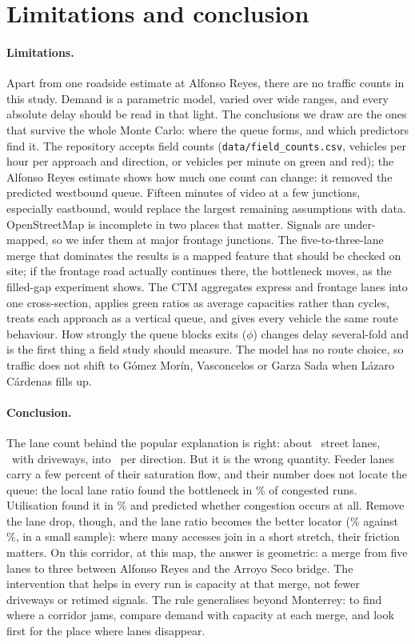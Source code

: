 \section{Limitations and conclusion}
\label{sec:conclusion}

\paragraph{Limitations.} Apart from one roadside estimate at Alfonso
Reyes, there are no traffic counts in this study. Demand is a parametric model, varied over wide ranges, and every absolute
delay should be read in that light. The conclusions we draw are the ones
that survive the whole Monte Carlo: where the queue forms, and which
predictors find it. The repository accepts field counts
(\texttt{data/field\_counts.csv}, vehicles per hour per approach and
direction, or vehicles per minute on green and red); the Alfonso Reyes
estimate shows how much one count can change: it removed the predicted
westbound queue. Fifteen minutes of video at a few junctions, especially
eastbound, would replace the largest remaining assumptions with data. OpenStreetMap is incomplete in two places
that matter. Signals are under-mapped, so we infer them at major
frontage junctions. The five-to-three-lane merge that dominates the
results is a mapped feature that should be checked on site; if the
frontage road actually continues there, the bottleneck moves, as the
filled-gap experiment shows. The CTM aggregates express and frontage
lanes into one cross-section, applies green ratios as average capacities
rather than cycles, treats each approach as a vertical queue, and gives
every vehicle the same route behaviour. How strongly the queue blocks
exits ($\phi$) changes delay several-fold and is the first thing a field
study should measure. The model has no route choice, so traffic does not
shift to Gómez Mor\'in, Vasconcelos or Garza Sada when L\'azaro C\'ardenas
fills up.

\paragraph{Conclusion.} The lane count behind the popular explanation is
right: about \InvFeederLanesNoService\ street lanes, \InvFeederLanes\
with driveways, into \InvMainlineLanes\ per direction. But it is the
wrong quantity. Feeder lanes carry a few percent of their saturation flow,
and their number does not locate the queue: the local lane ratio found
the bottleneck in \McHitLR\% of congested runs. Utilisation found it in
\McHitRho\% and predicted whether congestion occurs at all. Remove the
lane drop, though, and the lane ratio becomes the better locator
(\McGapHitLR\% against \McGapHitRho\%, in a small sample): where many
accesses join in a short stretch, their friction matters. On this
corridor, at this map, the answer is geometric: a merge from five lanes
to three between Alfonso Reyes and the Arroyo Seco bridge. The
intervention that helps in every run is capacity at that merge, not
fewer driveways or retimed signals. The rule generalises beyond
Monterrey: to find where a corridor jams, compare demand with capacity at
each merge, and look first for the place where lanes disappear.
